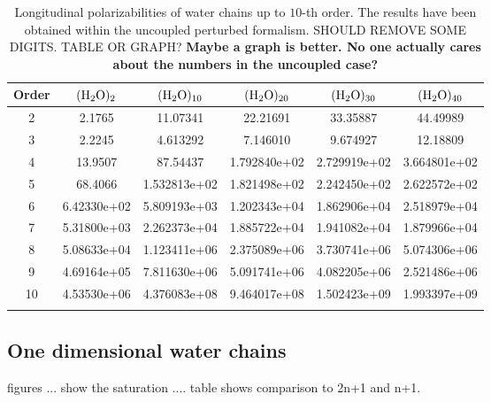 \documentclass[prl,aps,twocolumn,showpacs,twocolumngrid,superbib]{revtex4}
\begin{document}
\begin{table}[t]
  \centering
  \caption{\protect
    Longitudinal polarizabilities of water chains up to $10$-th order.
    The results have been obtained within the uncoupled perturbed formalism.
    SHOULD REMOVE SOME DIGITS. TABLE OR GRAPH? {\bf Maybe a graph is better. No one actually
    cares about the numbers in the uncoupled case?}
   }\label{tab:UCPHF_1D_h2o}
  \begin{tabular}{cccccc}
    \toprule
    Order 
          & $\rm (H_2O)_2$
          & $\rm (H_2O)_{10}$
          & $\rm (H_2O)_{20}$
          & $\rm (H_2O)_{30}$
          & $\rm (H_2O)_{40}$ \\
    \hline 
    2 & 2.1765      & 11.07341      & 22.21691     & 33.35887     & 44.49989    \\
    3 & 2.2245      & 4.613292      & 7.146010     & 9.674927     & 12.18809    \\
    4 & 13.9507     & 87.54437      & 1.792840e+02 & 2.729919e+02 & 3.664801e+02\\
    5 & 68.4066     & 1.532813e+02  & 1.821498e+02 & 2.242450e+02 & 2.622572e+02\\
    6 & 6.42330e+02 & 5.809193e+03  & 1.202343e+04 & 1.862906e+04 & 2.518979e+04\\
    7 & 5.31800e+03 & 2.262373e+04  & 1.885722e+04 & 1.941082e+04 & 1.879966e+04\\
    8 & 5.08633e+04 & 1.123411e+06  & 2.375089e+06 & 3.730741e+06 & 5.074306e+06\\
    9 & 4.69164e+05 & 7.811630e+06  & 5.091741e+06 & 4.082205e+06 & 2.521486e+06\\
   10 & 4.53530e+06 & 4.376083e+08  & 9.464017e+08 & 1.502423e+09 & 1.993397e+09\\
    \botrule
  \end{tabular}
\end{table}


\subsection{One dimensional water chains}
figures ... show the saturation ....
table shows comparison to 2n+1 and n+1.
\end{document}
